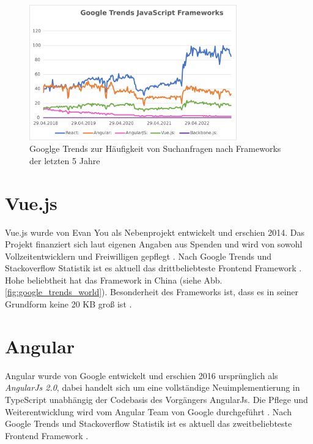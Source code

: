 \begin{figure}[!htb]
    \centering
    \includegraphics[width=0.8\textwidth]{img/Google Stats/google_frameworks_trends}
    \caption{Googlge Trends zur Häufigkeit von Suchanfragen nach Frameworks der letzten 5 Jahre \cite{googleTrends}}
    \label{fig:google_trends}
\end{figure}


\section{Vue.js}
Vue.js wurde von Evan You als Nebenprojekt entwickelt und erschien 2014.
Das Projekt finanziert sich laut eigenen Angaben aus Spenden und
wird von sowohl Vollzeitentwicklern und Freiwilligen gepflegt \cite{vueFAQ}.
Nach Google Trends und Stackoverflow Statistik ist es aktuell das drittbeliebteste
Frontend Framework \cite{googleTrends} \cite{stackoverflowStats}.
Hohe beliebtheit hat das Framework in China (siehe Abb.\ref{fig:google_trends_world}).
Besonderheit des Frameworks ist, dass es in seiner Grundform keine 20 KB groß ist \cite[S. 523]{bin2019}.


\section{Angular}
Angular wurde von Google entwickelt und erschien 2016 ursprünglich als \emph{AngularJs 2.0},
dabei handelt sich um eine vollständige Neuimplementierung in TypeScript unabhängig der Codebasis des Vorgängers AngularJs.
Die Pflege und Weiterentwicklung wird vom Angular Team von Google durchgeführt \cite[S. 209-210]{bin2019}.
Nach Google Trends und Stackoverflow Statistik ist es aktuell das zweitbeliebteste
Frontend Framework \cite{googleTrends} \cite{stackoverflowStats}.

\newpage

